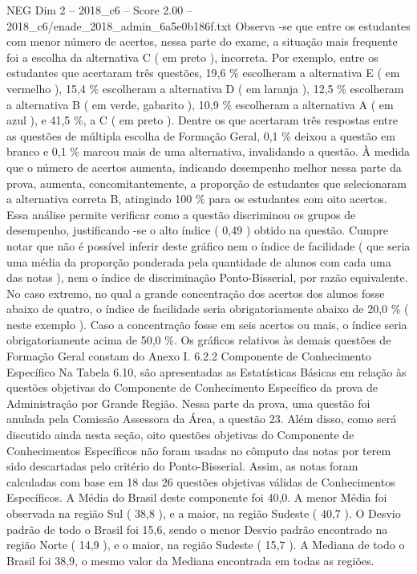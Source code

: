 \begin{textsample}{NEG Dim 2 – 2018\_c6 – Score 2.00 – 2018\_c6/enade\_2018\_admin\_6a5e0b186f.txt}
Observa -se que entre os estudantes com menor número de acertos, nessa parte do exame, a situação mais frequente foi a escolha da alternativa C ( em preto ), incorreta.
Por exemplo, entre os estudantes que acertaram três questões, 19,6 \% escolheram a alternativa E ( em vermelho ), 15,4 \% escolheram a alternativa D ( em laranja ), 12,5 \% escolheram a alternativa B ( em verde, gabarito ), 10,9 \% escolheram a alternativa A ( em azul ), e 41,5 \%, a C ( em preto ).
Dentre os que acertaram três respostas entre as questões de múltipla escolha de Formação Geral, 0,1 \% deixou a questão em branco e 0,1 \% marcou mais de uma alternativa, invalidando a questão.
À medida que o número de acertos aumenta, indicando desempenho melhor nessa parte da prova, aumenta, concomitantemente, a proporção de estudantes que selecionaram a alternativa correta B, atingindo 100 \% para os estudantes com oito acertos.
Essa análise permite verificar como a questão discriminou os grupos de desempenho, justificando -se o alto índice ( 0,49 ) obtido na questão.
Cumpre notar que não é possível inferir deste gráfico nem o índice de facilidade ( que seria uma média da proporção ponderada pela quantidade de alunos com cada uma das notas ), nem o índice de discriminação Ponto-Bisserial, por razão equivalente.
No caso extremo, no qual a grande concentração dos acertos dos alunos fosse abaixo de quatro, o índice de facilidade seria obrigatoriamente abaixo de 20,0 \% ( neste exemplo ).
Caso a concentração fosse em seis acertos ou mais, o índice seria obrigatoriamente acima de 50,0 \%.
Os gráficos relativos às demais questões de Formação Geral constam do Anexo I. 6.2.2 Componente de Conhecimento Específico Na Tabela 6.10, são apresentadas as Estatísticas Básicas em relação às questões objetivas do Componente de Conhecimento Específico da prova de Administração por Grande Região.
Nessa parte da prova, uma questão foi anulada pela Comissão Assessora da Área, a questão 23.
Além disso, como será discutido ainda nesta seção, oito questões objetivas do Componente de Conhecimentos Específicos não foram usadas no cômputo das notas por terem sido descartadas pelo critério do Ponto-Bisserial.
Assim, as notas foram calculadas com base em 18 das 26 questões objetivas válidas de Conhecimentos Específicos.
A Média do Brasil deste componente foi 40,0.
A menor Média foi observada na região Sul ( 38,8 ), e a maior, na região Sudeste ( 40,7 ).
O Desvio padrão de todo o Brasil foi 15,6, sendo o menor Desvio padrão encontrado na região Norte ( 14,9 ), e o maior, na região Sudeste ( 15,7 ).
A Mediana de todo o Brasil foi 38,9, o mesmo valor da Mediana encontrada em todas as regiões.

\end{textsample}
